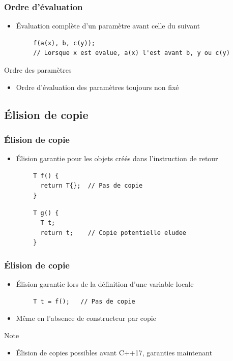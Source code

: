 \documentclass[C++.tex]{subfiles}
\begin{document}
\begin{frame}[fragile]
	\frametitle{Ordre d'évaluation}
	\begin{itemize}
		\item Évaluation complète d'un paramètre avant celle du suivant
	\end{itemize}

	\begin{verbatim}
		f(a(x), b, c(y));
		// Lorsque x est evalue, a(x) l'est avant b, y ou c(y)
	\end{verbatim}

	\begin{alertblock}{Ordre des paramètres}
		\begin{itemize}
			\item Ordre d'évaluation des paramètres toujours non fixé
		\end{itemize}
	\end{alertblock}
\end{frame}

\subsection*{Élision de copie}
\begin{frame}[fragile]
	\frametitle{Élision de copie}
	\begin{itemize}
		\item Élision garantie pour les objets créés dans l'instruction de retour
	\end{itemize}

	\begin{verbatim}
		T f() {
		  return T{};  // Pas de copie
		}
	\end{verbatim}

	\begin{verbatim}
		T g() {
		  T t;
		  return t;    // Copie potentielle eludee
		}
	\end{verbatim}
\end{frame}

\begin{frame}[fragile]
	\frametitle{Élision de copie}
	\begin{itemize}
		\item Élision garantie lors de la définition d'une variable locale
	\end{itemize}

	\begin{verbatim}
		T t = f();   // Pas de copie
	\end{verbatim}

	\begin{itemize}
		\item Même en l'absence de constructeur par copie
	\end{itemize}

	\begin{block}{Note}
		\begin{itemize}
			\item Élision de copies possibles avant C++17, garanties maintenant
		\end{itemize}
	\end{block}
\end{frame}
\end{document}
